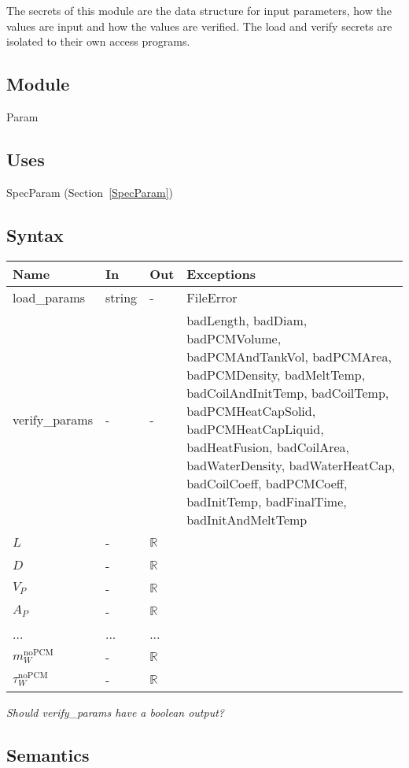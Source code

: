 \documentclass[12pt]{article}
\begin{document}
The secrets of this module are the data structure for input parameters, how the
values are input and how the values are verified.  The load and verify secrets
are isolated to their own access programs.

\subsection{Module}

Param

\subsection{Uses}

SpecParam (Section~\ref{SpecParam})

\subsection{Syntax}

\begin{tabular}{p{3cm} p{1cm} p{1cm} >{\raggedright\arraybackslash}p{9cm}}
\toprule
\textbf{Name} & \textbf{In} & \textbf{Out} & \textbf{Exceptions} \\
\midrule
load\_params & string & - &  FileError \\
verify\_params & - & - & badLength, badDiam, badPCMVolume, badPCMAndTankVol,
                        badPCMArea, badPCMDensity, badMeltTemp,
                        badCoilAndInitTemp, badCoilTemp, badPCMHeatCapSolid,
                        badPCMHeatCapLiquid, badHeatFusion, badCoilArea,
                        badWaterDensity, badWaterHeatCap, badCoilCoeff,
                        badPCMCoeff, badInitTemp, badFinalTime,
                        badInitAndMeltTemp \\
$L$ & - & $\mathbb{R}$\\
$D$ & - & $\mathbb{R}$\\
$V_P$ & - & $\mathbb{R}$\\
$A_P$ & - & $\mathbb{R}$\\
... & ... & ...\\
$m_W^{\text{noPCM}}$ & - & $\mathbb{R}$ \\
$\tau_W^{\text{noPCM}}$ & - & $\mathbb{R}$\\
\bottomrule
\end{tabular}

\textit{Should verify\_params have a boolean output?}

\subsection{Semantics}
\end{document}
